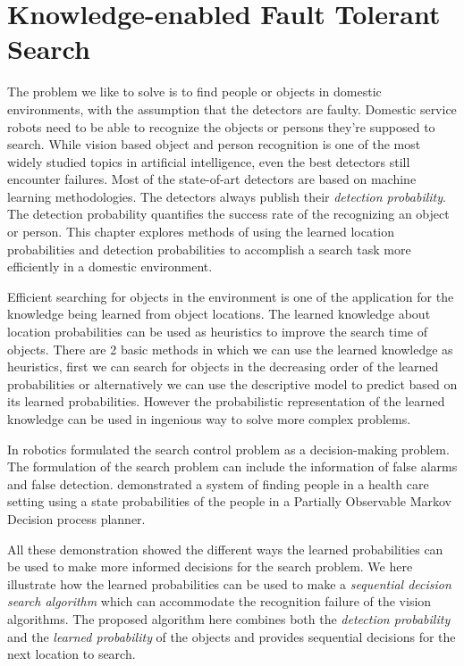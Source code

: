 
\chapter{Knowledge-enabled Fault Tolerant Search}
\label{cha}


The problem we like to solve is to find people or objects in domestic environments, with the assumption that the detectors are faulty. Domestic service robots need to be able to recognize the objects or persons they’re supposed to search. While vision based object and person recognition is one of the most widely studied topics in artificial intelligence, even the best detectors still encounter failures. Most of the state-of-art detectors are based on machine learning methodologies. The detectors always publish their \emph{detection probability}. The detection probability quantifies the success rate of the recognizing an object or person. This chapter explores methods of using the learned location probabilities and detection probabilities to accomplish a search task more efficiently in a domestic environment. 


Efficient searching for objects in the environment is one of the application for the knowledge being learned from object locations. The learned knowledge about location probabilities can be used as heuristics to improve the search time of objects. There are 2 basic methods in which we can use the learned knowledge as heuristics, first we can search for objects in the decreasing order of the learned probabilities or alternatively we can use the descriptive model to predict based on its learned probabilities. However the probabilistic representation of the learned knowledge can be used in ingenious way to solve more complex problems. 

In robotics \cite{chung2007decision} formulated the search control problem as a decision-making problem. The formulation of the search problem can include the information of false alarms and false detection. \cite{roy2003planning} demonstrated a system of finding people in a health care setting using a state probabilities of the people in a Partially Observable Markov Decision process planner. 


All these demonstration showed the different ways the learned probabilities can be used to make more informed decisions for the search problem. We here illustrate how the learned probabilities can be used to make a \emph{sequential decision search algorithm} which can accommodate the recognition failure of the vision algorithms. The proposed algorithm here combines both the \emph{detection probability} and the \emph{learned probability} of the objects and provides sequential decisions for the next location to search.

